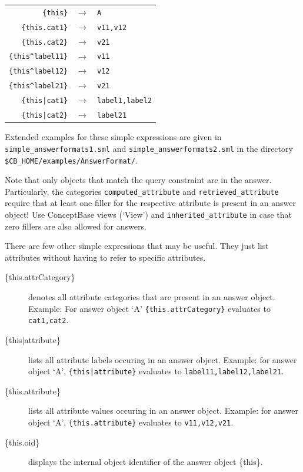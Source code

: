 \begin{tabular}{rcl}
    \verb+{this}+ & $\longrightarrow$ & {\tt A} \\
    \verb+{this.cat1}+ & $\longrightarrow$ & {\tt v11,v12}\\
    \verb+{this.cat2}+ & $\longrightarrow$ & {\tt v21}\\
    \verb+{this^label11}+ & $\longrightarrow$ & {\tt v11}\\
    \verb+{this^label12}+ & $\longrightarrow$ & {\tt v12}\\
    \verb+{this^label21}+ & $\longrightarrow$ & {\tt v21}\\
    \verb+{this|cat1}+ & $\longrightarrow$ & {\tt label1,label2}\\
    \verb+{this|cat2}+ & $\longrightarrow$ & {\tt label21}\\
\end{tabular}

Extended examples for these simple expressions are given in {\tt simple\_answerformats1.sml} and {\tt simple\_answerformats2.sml} in
the directory \verb+$CB_HOME/examples/AnswerFormat/+.

Note that only objects that match the query constraint are in the answer. Particularly, the categories {\tt computed\_attribute} and {\tt retrieved\_attribute}
require that at least one filler for the respective attribute is present in an answer object!
Use ConceptBase views (`View') and {\tt inherited\_attribute} in case that
zero fillers are also allowed for answers.

There are few other simple expressions that may be useful. They just list attributes without having to refer to specific attributes.

\begin{description}
\item[\{this.attrCategory\}]
denotes all attribute categories that are present in an answer object. Example: For answer object `A' \verb+{this.attrCategory}+ evaluates to {\tt cat1,cat2}.

\item[\{this$\mid$attribute\}]
lists all attribute labels occuring in an answer object. Example: for answer object `A', \verb+{this|attribute}+ evaluates to {\tt label11,label12,label21}.

\item[\{this.attribute\}]
lists all attribute values occuring in an answer object. Example: for answer object `A', \verb+{this.attribute}+ evaluates to {\tt v11,v12,v21}.

\item[\{this.oid\}]
displays the internal object identifier of the answer object \{this\}.
\end{description}

